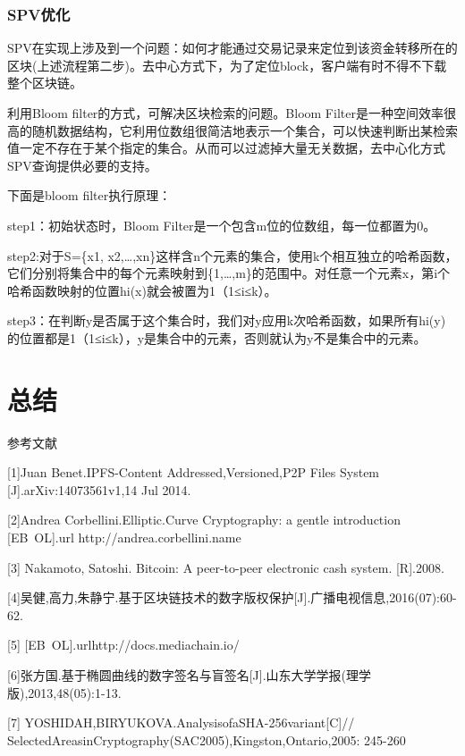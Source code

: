 \documentclass[withoutpreface,bwprint]{cumcmthesis} %
\begin{document}
\subsubsection{SPV优化}

SPV在实现上涉及到一个问题：如何才能通过交易记录来定位到该资金转移所在的区块(上述流程第二步)。去中心方式下，为了定位block，客户端有时不得不下载整个区块链。

利用Bloom filter的方式，可解决区块检索的问题。Bloom Filter是一种空间效率很高的随机数据结构，它利用位数组很简洁地表示一个集合，可以快速判断出某检索值一定不存在于某个指定的集合。从而可以过滤掉大量无关数据，去中心化方式SPV查询提供必要的支持。

下面是bloom filter执行原理：

step1：初始状态时，Bloom Filter是一个包含m位的位数组，每一位都置为0。

step2:对于S=\{x1, x2,…,xn\}这样含n个元素的集合，使用k个相互独立的哈希函数，它们分别将集合中的每个元素映射到\{1,…,m\}的范围中。对任意一个元素x，第i个哈希函数映射的位置hi(x)就会被置为1（1≤i≤k）。   

step3：在判断y是否属于这个集合时，我们对y应用k次哈希函数，如果所有hi(y)的位置都是1（1≤i≤k），y是集合中的元素，否则就认为y不是集合中的元素。

\section{总结}

参考文献

[1]Juan Benet.IPFS-Content Addressed,Versioned,P2P Files System [J].arXiv:14073561v1,14 Jul 2014.

[2]Andrea Corbellini.Elliptic.Curve Cryptography: a gentle introduction [EB\ OL].url{ http://andrea.corbellini.name}

[3] Nakamoto, Satoshi. Bitcoin: A peer-to-peer electronic cash system. [R].2008.

[4]吴健,高力,朱静宁.基于区块链技术的数字版权保护[J].广播电视信息,2016(07):60-62.

[5] [EB\ OL].url{http://docs.mediachain.io/}

[6]张方国.基于椭圆曲线的数字签名与盲签名[J].山东大学学报(理学版),2013,48(05):1-13.

[7] YOSHIDAH,BIRYUKOVA.AnalysisofaSHA-256variant[C]//
SelectedAreasinCryptography(SAC2005),Kingston,Ontario,2005:
245-260
\end{document}

